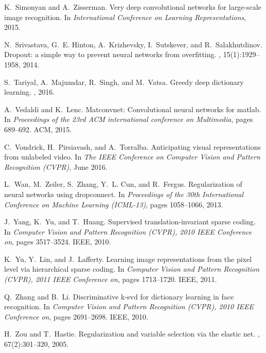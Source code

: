 \documentclass[10pt,twocolumn,letterpaper]{article}
\begin{document}
\begin{thebibliography}{10}
K.~Simonyan and A.~Zisserman.
\newblock Very deep convolutional networks for large-scale image recognition.
\newblock In {\em International Conference on Learning Representations}, 2015.

N.~Srivastava, G.~E. Hinton, A.~Krizhevsky, I.~Sutskever, and R.~Salakhutdinov.
\newblock Dropout: a simple way to prevent neural networks from overfitting.
, 15(1):1929--1958, 2014.

S.~Tariyal, A.~Majumdar, R.~Singh, and M.~Vatsa.
\newblock Greedy deep dictionary learning.
, 2016.

A.~Vedaldi and K.~Lenc.
\newblock Matconvnet: Convolutional neural networks for matlab.
\newblock In {\em Proceedings of the 23rd ACM international conference on
  Multimedia}, pages 689--692. ACM, 2015.

C.~Vondrick, H.~Pirsiavash, and A.~Torralba.
\newblock Anticipating visual representations from unlabeled video.
\newblock In {\em The IEEE Conference on Computer Vision and Pattern
  Recognition (CVPR)}, June 2016.

L.~Wan, M.~Zeiler, S.~Zhang, Y.~L. Cun, and R.~Fergus.
\newblock Regularization of neural networks using dropconnect.
\newblock In {\em Proceedings of the 30th International Conference on Machine
  Learning (ICML-13)}, pages 1058--1066, 2013.

J.~Yang, K.~Yu, and T.~Huang.
\newblock Supervised translation-invariant sparse coding.
\newblock In {\em Computer Vision and Pattern Recognition (CVPR), 2010 IEEE
  Conference on}, pages 3517--3524. IEEE, 2010.

K.~Yu, Y.~Lin, and J.~Lafferty.
\newblock Learning image representations from the pixel level via hierarchical
  sparse coding.
\newblock In {\em Computer Vision and Pattern Recognition (CVPR), 2011 IEEE
  Conference on}, pages 1713--1720. IEEE, 2011.

Q.~Zhang and B.~Li.
\newblock Discriminative k-svd for dictionary learning in face recognition.
\newblock In {\em Computer Vision and Pattern Recognition (CVPR), 2010 IEEE
  Conference on}, pages 2691--2698. IEEE, 2010.

H.~Zou and T.~Hastie.
\newblock Regularization and variable selection via the elastic net.
, 67(2):301--320, 2005.

\end{thebibliography}
%
%
\end{document}
